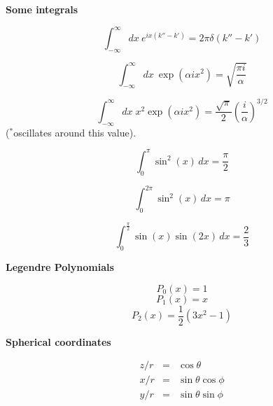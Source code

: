 \documentclass[11pt]{article}
\begin{document}
\begin{multicols}{2}
{\bf Some integrals}

\begin{equation}
\int_{-\infty}^{\infty} dx \: e^{ix(k''-k')} = 2 \pi \delta (k''-k')
\end{equation}

\begin{equation}
\int_{-\infty}^{\infty} dx \: \exp (\alpha i x^2) = \sqrt{\frac{\pi i}{\alpha}}
\label{eq:simp_int}
\end{equation}

\begin{equation}
\int_{-\infty}^{\infty} dx \; x^2 \exp (\alpha i x^2)
  = \frac{\sqrt{\pi}}{2} \left( \frac{i}{\alpha} \right)^{3/2}
\label{eq:2nd_simp_int}
\end{equation}
{\small ($^{*}$oscillates around this value)}.

\begin{equation}
\int_{0}^{\pi} \sin^{2}{\left (x \right )}\, dx  =  \frac{\pi}{2}
\end{equation}

\begin{equation}
\int_{0}^{2 \pi} \sin^{2}{\left (x \right )}\, dx  =  \pi
\end{equation}

\begin{equation}
\int_{0}^{\frac{\pi}{2}} \sin{\left (x \right )} \sin{\left (2 x \right )}\, dx  =  \frac{2}{3}
\end{equation}



{\bf Legendre Polynomials}

\begin{equation}
P_0(x) = 1
\end{equation}
\begin{equation}
P_1(x) = x
\end{equation}
\begin{equation}
P_2(x) = \frac{1}{2} (3x^2-1)
\end{equation}

{\bf Spherical coordinates}

\begin{eqnarray}
z/r & = & \cos \theta \\
x/r & = & \sin \theta \cos \phi \\
y/r & = & \sin \theta \sin \phi
\end{eqnarray}

\end{multicols}

\pagebreak
\end{document}
